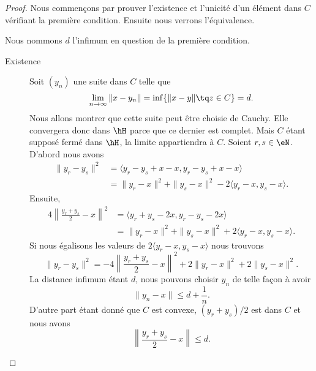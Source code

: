 \begin{proof}
    Nous commençons par prouver l'existence et l'unicité d'un élément dans \( C\) vérifiant la première condition. Ensuite nous verrons l'équivalence.

    Nous nommons \( d\) l'infimum en question de la première condition.
    \begin{description}
        \item[Existence]
    Soit \( (y_n)\) une suite dans \( C\) telle que
    \begin{equation}
        \lim_{n\to \infty} \| x-y_n \|=\inf\{ \| x-y \|\tq z\in C \}=d.
    \end{equation}
    Nous allons montrer que cette suite peut être choisie de Cauchy. Elle convergera donc dans \( \hH\) parce que ce dernier est complet. Mais \( C\) étant supposé fermé dans \( \hH\), la limite appartiendra à \( C\). Soient \( r,s\in \eN\). D'abord nous avons
    \begin{subequations}
        \begin{align}
            \| y_r-y_s \|^2&=\langle y_r-y_s+x-x, y_r-y_s+x-x\rangle \\
            &=\| y_r-x \|^2+\| y_s-x \|^2-2\langle y_r-x, y_s-x\rangle .
        \end{align}
    \end{subequations}
    Ensuite,
    \begin{subequations}
        \begin{align}
            4\left\| \frac{ y_r+y_s }{2}-x \right\|^2&=\langle y_r+y_s-2x, y_r-y_s-2x\rangle \\
            &=\| y_r-x \|^2+\| y_s-x \|^2+2\langle y_r-x, y_s-x\rangle .
        \end{align}
    \end{subequations}
    Si nous égalisons les valeurs de \( 2\langle y_r-x, y_s-x\rangle \) nous trouvons
    \begin{equation}    \label{EqiqCyUa}
        \| y_r-y_s \|^2=-4\left\| \frac{ y_r+y_s }{2}-x \right\|^2+2\| y_r-x \|^2+2\| y_s-x \|^2.
    \end{equation}
    La distance infimum étant \( d\), nous pouvons choisir \( y_n\) de telle façon à avoir
    \begin{equation}
        \| y_n-x \|\leq d+\frac{1}{ n }.
    \end{equation}
    D'autre part étant donné que \( C\) est convexe, \( (y_r+y_s)/2\) est dans \( C\) et nous avons
    \begin{equation}
        \left\| \frac{ y_r+y_s }{2}-x \right\| \leq d.

\end{equation}
\end{description}
\end{proof}
